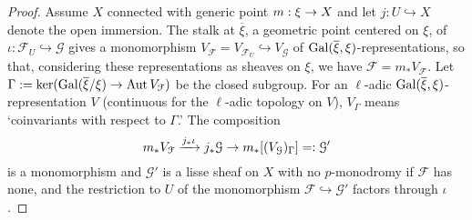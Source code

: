 \documentclass[deligne.tex]{subfiles}
\begin{document}
\begin{proof}
Assume $X$ connected with generic point $m:\xi\rightarrow X$ and let 
$j:U\hookrightarrow X$ denote the open immersion.
The stalk at $\overline\xi$, a geometric point centered on $\xi$, of
$\iota:\mathcal F_U\hookrightarrow\mathcal G$ gives a monomorphism
$V_{\mathcal F}=V_{\mathcal F_U}\hookrightarrow V_{\mathcal G}$ of
$\operatorname{Gal}(\overline\xi,\xi)$-representations, so that, considering these
representations as sheaves on $\xi$, we have $\mathcal F=m_*V_{\mathcal F}$.
Let $\Gamma:=\ker(\operatorname{Gal}(\overline\xi/\xi)\rightarrow\operatorname{Aut} V_{\mathcal F})$ be
the closed subgroup.
For an $\ell$-adic $\operatorname{Gal}(\overline\xi,\xi)$-representation $V$ (continuous
for the $\ell$-adic topology on $V$), $V_\Gamma$ means 
`coinvariants with respect to $\Gamma$.' The composition
\begin{equation*}
	m_*V_\mathcal F\xrightarrow{j_*\iota} j_*\mathcal G\rightarrow m_*[(V_\mathcal G)_\Gamma]=:\mathcal G'
\end{equation*}
is a monomorphism and $\mathcal G'$ is a lisse sheaf on $X$ with no
$p$-monodromy if $\mathcal F$ has none, and
the restriction to $U$ of the monomorphism
$\mathcal F\hookrightarrow\mathcal G'$ factors through $\iota$.
\end{proof}
\end{document}
